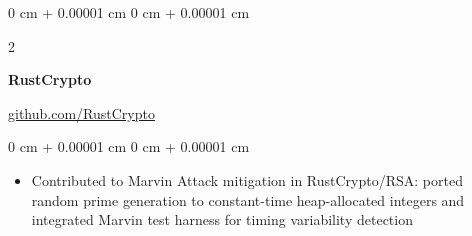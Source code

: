 \documentclass[10pt, letterpaper]{article}
\newenvironment{highlights}{
    \begin{itemize}[
        topsep=0.10 cm,
        parsep=0.10 cm,
        partopsep=0pt,
        itemsep=0pt,
        leftmargin=0 cm + 10pt
    ]
}{
    \end{itemize}
} %
\newenvironment{onecolentry}{
    \begin{adjustwidth}{
        0 cm + 0.00001 cm
    }{
        0 cm + 0.00001 cm
    }
}{
    \end{adjustwidth}
} %
\newenvironment{twocolentry}[2][]{
    \onecolentry
    \def\secondColumn{#2}
    \setcolumnwidth{\fill, 4.5 cm}
    \begin{paracol}{2}
}{
    \switchcolumn \raggedleft \secondColumn
    \end{paracol}
    \endonecolentry
} %
\begin{document}
        \begin{twocolentry}
            {\href{https://github.com/RustCrypto}{github.com/RustCrypto}}
            {\textbf{RustCrypto}}
        \end{twocolentry}
        \vspace{0.1cm}
        \begin{onecolentry}
            \vspace{0.1cm}


            \begin{highlights}
                \item Contributed to Marvin Attack mitigation in RustCrypto/RSA: ported random prime generation to constant-time heap-allocated integers and integrated Marvin test harness for timing variability detection
            \end{highlights}
        \end{onecolentry}
        \vspace{0.3cm}

\end{document}
